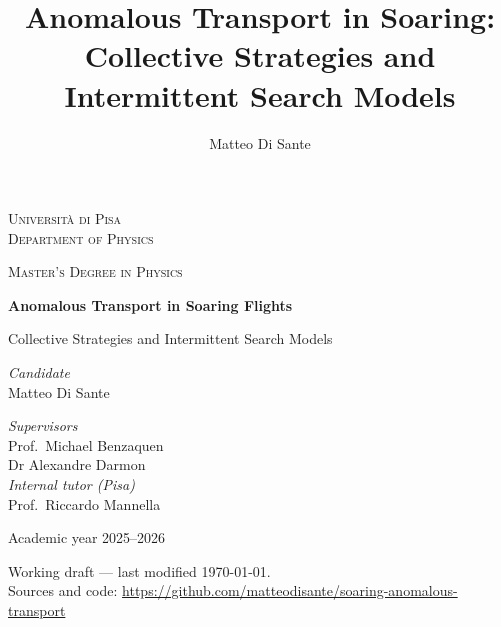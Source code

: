 %


\title{Anomalous Transport in Soaring: Collective Strategies and Intermittent Search Models}
\author{Matteo Di Sante}


\hypersetup{pageanchor=false}

\begin{titlepage}
\centering
{\scshape\large Università di Pisa \\ Department of Physics\par}
{\scshape Master's Degree in Physics\par}
\vfill
{\Huge\bfseries Anomalous Transport in Soaring Flights\par}
\vspace{0.8em}
{\LARGE Collective Strategies and Intermittent Search Models\par}
\vfill
\begin{minipage}[t]{0.45\textwidth}
  \raggedright\large
  \textit{Candidate}\\
  Matteo Di Sante\par
\end{minipage}\hfill
\begin{minipage}[t]{0.45\textwidth}
  \raggedleft\large
  \textit{Supervisors}\\
  Prof.\ Michael Benzaquen\\
  Dr Alexandre Darmon\\[0.6em]
  \textit{Internal tutor (Pisa)}\\
  Prof.\ Riccardo Mannella\par
\end{minipage}
\vfill
{\large Academic year 2025--2026\par}
\vspace{1em}
{\small Working draft --- last modified \today.\\
Sources and code: \url{https://github.com/matteodisante/soaring-anomalous-transport}\par}
\end{titlepage}

